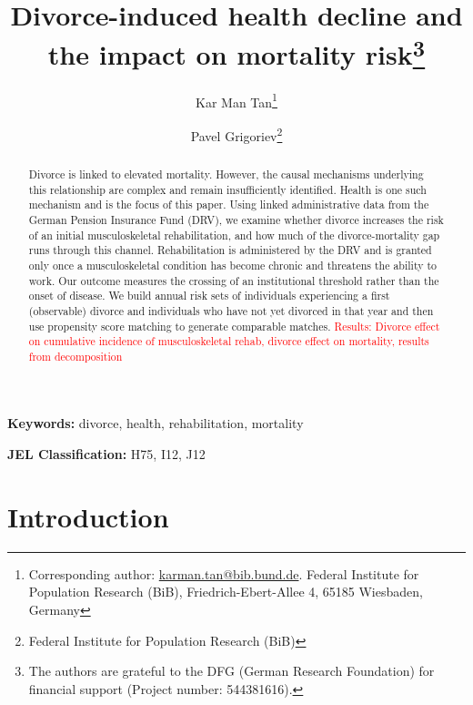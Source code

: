 \documentclass[a4paper,12pt]{article}
\title{Divorce-induced health decline and the impact on mortality risk\thanks{The authors are grateful to the DFG (German Research Foundation) for financial support (Project number: 544381616).}}
\author{Kar Man Tan\thanks{Corresponding author: \href{mailto:karman.tan@bib.bund.de}{karman.tan@bib.bund.de}. Federal Institute for Population Research (BiB), Friedrich-Ebert-Allee 4, 65185 Wiesbaden, Germany}
\and
Pavel Grigoriev\thanks{Federal Institute for Population Research (BiB)}}
\theoremstyle{plain}
\theoremstyle{definition}
\theoremstyle{TheoremNum}
\theoremstyle{CorollaryNum}
\theoremstyle{PropositionNum}
\theoremstyle{TheoremNum}
\begin{document}
\maketitle

\begin{abstract}
Divorce is linked to elevated mortality. However, the causal mechanisms underlying this relationship are complex and remain insufficiently identified. Health is one such mechanism and is the focus of this paper. Using linked administrative data from the German Pension Insurance Fund (DRV), we examine whether divorce increases the risk of an initial musculoskeletal rehabilitation, and how much of the divorce-mortality gap runs through this channel. Rehabilitation is administered by the DRV and is granted only once a musculoskeletal condition has become chronic and threatens the ability to work. Our outcome measures the crossing of an institutional threshold rather than the onset of disease. We build annual risk sets of individuals experiencing a first (observable) divorce and individuals who have not yet divorced in that year and then use propensity score matching to generate comparable matches. \textcolor{red}{Results: Divorce effect on cumulative incidence of musculoskeletal rehab, divorce effect on mortality, results from decomposition}
\end{abstract}

\textbf{Keywords:} divorce, health, rehabilitation, mortality

\textbf{JEL Classification:} H75, I12, J12


\newpage

\section{Introduction}
\end{document}
